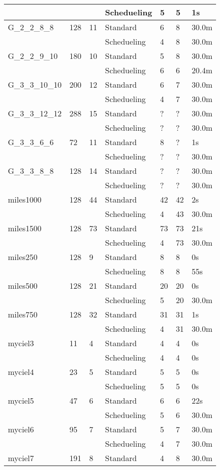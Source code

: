 \begin{longtable}{|lll|l|l|l|l|}
\cline{4-7}
&&&Schedueling&5  &5 &1s\\
\hline
G\_2\_2\_8\_8&128&11&Standard&6&8&30.0m\\
\cline{4-7}
&&&Schedueling&4  &8 &30.0m\\
\hline
G\_2\_2\_9\_10&180&10&Standard&5&8&30.0m\\
\cline{4-7}
&&&Schedueling&6  &6 &20.4m\\
\hline
G\_3\_3\_10\_10&200&12&Standard&6&7&30.0m\\
\cline{4-7}
&&&Schedueling&4  &7 &30.0m\\
\hline
G\_3\_3\_12\_12&288&15&Standard&?&?&30.0m\\
\cline{4-7}
&&&Schedueling&?  &? &30.0m\\
\hline
G\_3\_3\_6\_6&72&11&Standard&8&?&1s\\
\cline{4-7}
&&&Schedueling&?  &? &30.0m\\
\hline
G\_3\_3\_8\_8&128&14&Standard&?&?&30.0m\\
\cline{4-7}
&&&Schedueling&?  &? &30.0m\\
\hline
miles1000&128&44&Standard&42&42&2s\\
\cline{4-7}
&&&Schedueling&4  &43 &30.0m\\
\hline
miles1500&128&73&Standard&73&73&21s\\
\cline{4-7}
&&&Schedueling&4  &73 &30.0m\\
\hline
miles250&128&9&Standard&8&8&0s\\
\cline{4-7}
&&&Schedueling&8  &8 &55s\\
\hline
miles500&128&21&Standard&20&20&0s\\
\cline{4-7}
&&&Schedueling&5  &20 &30.0m\\
\hline
miles750&128&32&Standard&31&31&1s\\
\cline{4-7}
&&&Schedueling&4  &31 &30.0m\\
\hline
myciel3&11&4&Standard&4&4&0s\\
\cline{4-7}
&&&Schedueling&4  &4 &0s\\
\hline
myciel4&23&5&Standard&5&5&0s\\
\cline{4-7}
&&&Schedueling&5  &5 &0s\\
\hline
myciel5&47&6&Standard&6&6&22s\\
\cline{4-7}
&&&Schedueling&5  &6 &30.0m\\
\hline
myciel6&95&7&Standard&5&7&30.0m\\
\cline{4-7}
&&&Schedueling&4  &7 &30.0m\\
\hline
myciel7&191&8&Standard&4&8&30.0m\\

\end{longtable}
